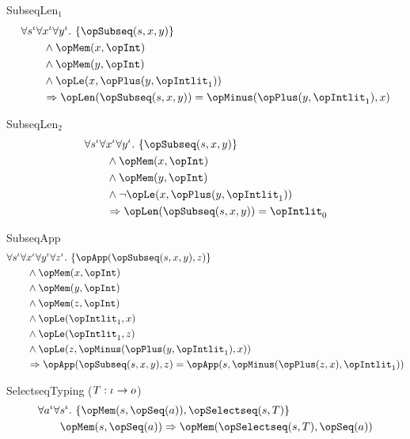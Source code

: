 \documentclass[11pt, a4paper, oneside]{article}
\begin{document}
\begin{axioms}
\item[SubseqLen$_1$] \[
        \begin{aligned}
            &\forall s^\idv \forall x^\idv \forall y^\idv.\, \st{ \opSubseq(s, x, y) } \\
            &\qquad \wedge \opMem(x, \opInt) \\
            &\qquad \wedge \opMem(y, \opInt) \\
            &\qquad \wedge \opLe(x, \opPlus(y, \opIntlit_1)) \\
            &\qquad \imp \opLen(\opSubseq(s, x, y)) = \opMinus(\opPlus(y, \opIntlit_1), x)
        \end{aligned}
    \]

\item[SubseqLen$_2$] \[
        \begin{aligned}
            &\forall s^\idv \forall x^\idv \forall y^\idv.\, \st{ \opSubseq(s, x, y) } \\
            &\qquad \wedge \opMem(x, \opInt) \\
            &\qquad \wedge \opMem(y, \opInt) \\
            &\qquad \wedge \neg \opLe(x, \opPlus(y, \opIntlit_1)) \\
            &\qquad \imp \opLen(\opSubseq(s, x, y)) = \opIntlit_0
        \end{aligned}
    \]

\item[SubseqApp] \[
        \begin{aligned}
            &\forall s^\idv \forall x^\idv \forall y^\idv \forall z^\idv.\, \st{ \opApp(\opSubseq(s, x, y), z) } \\
            &\qquad \wedge \opMem(x, \opInt) \\
            &\qquad \wedge \opMem(y, \opInt) \\
            &\qquad \wedge \opMem(z, \opInt) \\
            &\qquad \wedge \opLe(\opIntlit_1, x) \\
            &\qquad \wedge \opLe(\opIntlit_1, z) \\
            &\qquad \wedge \opLe(z, \opMinus(\opPlus(y, \opIntlit_1), x)) \\
            &\qquad \imp \opApp(\opSubseq(s, x, y), z) = \opApp(s, \opMinus(\opPlus(z, x), \opIntlit_1))
        \end{aligned}
    \]

\item[SelectseqTyping ($T : \iota \rightarrow o$)] \[
        \begin{aligned}
            &\forall a^\idv \forall s^\idv.\, \st{ \opMem(s, \opSeq(a)), \opSelectseq(s, T) } \\
            &\qquad \opMem(s, \opSeq(a)) \imp \opMem(\opSelectseq(s, T), \opSeq(a))
        \end{aligned}
    \]


\end{axioms}
\end{document}
